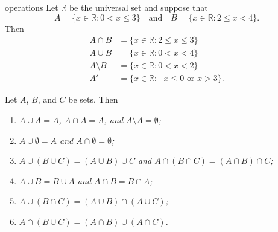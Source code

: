 \begin{example}{operations}
Let ${\mathbb R}$ be the universal set and suppose that
\[
A = \{ x \in {\mathbb R} : 0 < x \leq 3 \}
\quad \text{and} \quad
B = \{ x \in {\mathbb R} : 2 \leq x < 4 \}.
\]
Then
\begin{align*}
A \cap B & =  \{ x \in {\mathbb R} : 2 \leq x \leq 3 \} \\
A \cup B & =  \{ x \in {\mathbb R} : 0 < x < 4 \} \\
A \setminus B & =  \{ x \in {\mathbb R} : 0 < x < 2  \} \\
A' & =  \{ x \in {\mathbb R} : \mbox{ $x \leq 0$ or $x > 3$
} \}.
\end{align*}
\end{example}
 
\begin{proposition}\label{sets_theorem_set_ops}
Let $A$, $B$, and $C$ be sets. Then
\begin{enumerate}
 
\rm\item\it
$A \cup A = A$, $A \cap A = A$, and $A \setminus A = \emptyset$;
 
\rm\item\it
$A \cup \emptyset = A$ and $A \cap \emptyset = \emptyset$;
 
\rm\item\it
$A \cup (B \cup C) = (A \cup B) \cup C$ and  $A \cap (B \cap C) = (A \cap B) \cap C$;
 
\rm\item\it
$A \cup B = B \cup A$ and $A \cap B = B \cap A$;
 
\rm\item\it
$A \cup (B \cap C) = (A \cup B) \cap (A \cup C)$;
 
\rm\item\it
$A \cap (B \cup C) = (A \cap B) \cup (A \cap C)$.
 
\end{enumerate}
\end{proposition}

